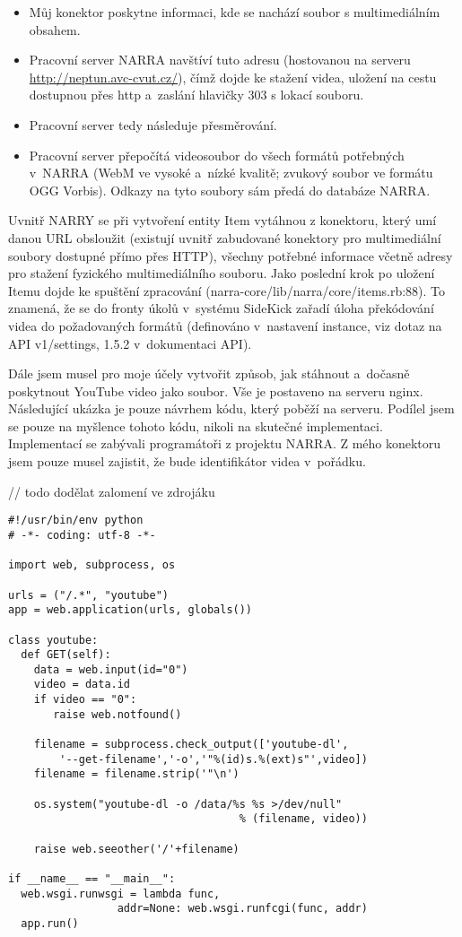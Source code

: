 \begin{itemize}
\item Můj konektor poskytne informaci, kde se nachází soubor s multimediálním obsahem.
\item Pracovní server NARRA navštíví tuto adresu (hostovanou na serveru \url{http://neptun.avc-cvut.cz/}), čímž dojde ke stažení videa, uložení na cestu dostupnou přes http a~zaslání hlavičky 303 s lokací souboru.
\item Pracovní server tedy následuje přesměrování. %
\item Pracovní server přepočítá videosoubor do všech formátů potřebných v~NARRA (WebM ve vysoké a~nízké kvalitě; zvukový soubor ve formátu OGG Vorbis). Odkazy na tyto soubory sám předá do databáze NARRA.
\end{itemize}

\par Uvnitř NARRY se při vytvoření entity Item vytáhnou z konektoru, který umí danou URL obsloužit (existují uvnitř zabudované konektory pro multimediální soubory dostupné přímo přes HTTP), všechny potřebné informace včetně adresy pro stažení fyzického multimediálního souboru. Jako poslední krok po uložení Itemu dojde ke spuštění zpracování (narra-core/lib/narra/core/\newline items.rb:88). To znamená, že se do fronty úkolů v~systému SideKick zařadí úloha překódování videa do požadovaných formátů (definováno v~nastavení instance, viz dotaz na API v1/settings, 1.5.2 v~dokumentaci API).
\par Dále jsem musel pro moje účely vytvořit způsob, jak stáhnout a~dočasně poskytnout YouTube video jako soubor. Vše je postaveno na serveru nginx. Následující ukázka je pouze návrhem kódu, který poběží na serveru. Podílel jsem se pouze na myšlence tohoto kódu, nikoli na skutečné implementaci. Implementací se zabývali programátoři z projektu NARRA. Z mého konektoru jsem pouze musel zajistit, že bude identifikátor videa v~pořádku.

// todo dodělat zalomení ve zdrojáku

\begin{verbatim}
#!/usr/bin/env python
# -*- coding: utf-8 -*-

import web, subprocess, os

urls = ("/.*", "youtube")
app = web.application(urls, globals())

class youtube:
  def GET(self):
    data = web.input(id="0")
    video = data.id
    if video == "0":
       raise web.notfound()
 
    filename = subprocess.check_output(['youtube-dl',
        '--get-filename','-o','"%(id)s.%(ext)s"',video])
    filename = filename.strip('"\n')
    
    os.system("youtube-dl -o /data/%s %s >/dev/null" 
                                    % (filename, video))
 
    raise web.seeother('/'+filename)
 
if __name__ == "__main__":
  web.wsgi.runwsgi = lambda func, 
                 addr=None: web.wsgi.runfcgi(func, addr)
  app.run()
\end{verbatim}